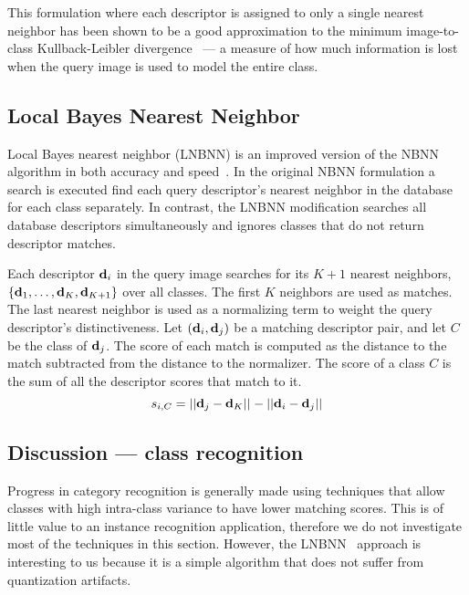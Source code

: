         This formulation where each descriptor is assigned to only a single nearest neighbor has been shown to be
          a good approximation to the minimum image-to-class Kullback-Leibler divergence~\cite{boiman_defense_2008}
          --- a measure of how much information is lost when the query image is used to model the entire class.

    \subsection{Local \Naive{} Bayes Nearest Neighbor}\label{sec:lnbnn}  

        Local \Naive{} Bayes nearest neighbor (LNBNN) is an improved version of the NBNN algorithm in both
          accuracy and speed~\cite{mccann_local_2012}.
        In the original NBNN formulation a search is executed find each query descriptor's nearest neighbor in
          the database for each class separately.
        In contrast, the LNBNN modification searches all database descriptors simultaneously and ignores classes
          that do not return descriptor matches.
        
        Each descriptor $\mathbf{d}_i$ in the query image searches for its $K+1$ nearest neighbors, $\{\mathbf{d}_1,
          \ldots, \mathbf{d}_K, \mathbf{d}_{K + 1}\}$ over all classes.
        The first $K$ neighbors are used as matches.
        The last nearest neighbor is used as a normalizing term to weight the query descriptor's distinctiveness.
        Let $(\mathbf{d}_i, \mathbf{d}_j)$ be a matching descriptor pair, and let $C$ be the class of $\mathbf{d}_j$.
        The score of each match is computed as the distance to the match subtracted from the distance to the
          normalizer.
        The score of a class $C$ is the sum of all the descriptor scores that match to it.
        \begin{equation}
            s_{i, C} = ||\mathbf{d}_j - \mathbf{d}_K||_{} - ||\mathbf{d}_i - \mathbf{d}_j||_{}
        \end{equation}

    \subsection{Discussion --- class recognition}

        Progress in category recognition is generally made using techniques that allow classes with high
          intra-class variance to have lower matching scores.
        This is of little value to an instance recognition application, therefore we do not investigate most of
          the techniques in this section.
        However, the LNBNN~\cite{mccann_local_2012} approach is interesting to us because it is a simple
          algorithm that does not suffer from quantization artifacts.


